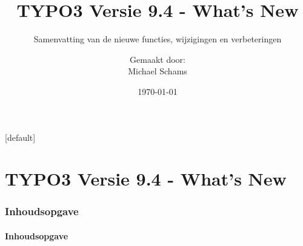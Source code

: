 \documentclass[t]{beamer}
\title{TYPO3 Versie 9.4 - What's New}
\subtitle{Samenvatting van de nieuwe functies, wijzigingen en verbeteringen}
\author{
	\centerline{Gemaakt door:}
	\centerline{Michael Schams}
}
\date{\today}
\begin{document}
\sharefont


\begingroup
	[default]
	\begin{frame}
		\titlepage
	\end{frame}
\endgroup


\section*{TYPO3 Versie 9.4 - What's New}
\begin{frame}[fragile]
	\frametitle{Inhoudsopgave}
	\framesubtitle{Inhoudsopgave}

	\tableofcontents

\end{frame}











%

\end{document}
